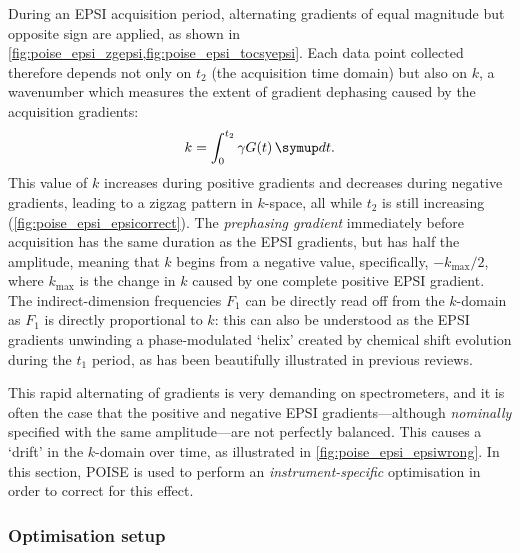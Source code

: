 During an EPSI acquisition period, alternating gradients of equal magnitude but opposite sign are applied, as shown in \cref{fig:poise_epsi_zgepsi,fig:poise_epsi_tocsyepsi}. Each data point collected therefore depends not only on $t_2$ (the acquisition time domain) but also on $k$, a wavenumber which measures the extent of gradient dephasing caused by the acquisition gradients:
\begin{equation}
    \label{eq:epsi_k_space}
    k = \int_0^{t_2} \gamma G(t) \,\md t.
\end{equation}
This value of $k$ increases during positive gradients and decreases during negative gradients, leading to a zigzag pattern in $k$-space, all while $t_2$ is still increasing (\cref{fig:poise_epsi_epsicorrect}).
The \textit{prephasing gradient} immediately before acquisition has the same duration as the EPSI gradients, but has half the amplitude, meaning that $k$ begins from a negative value, specifically, $-k_\text{max} / 2$, where $k_\text{max}$ is the change in $k$ caused by one complete positive EPSI gradient.
The indirect-dimension frequencies $F_1$ can be directly read off from the $k$-domain as $F_1$ is directly proportional to $k$: this can also be understood as the EPSI gradients unwinding a phase-modulated `helix' created by chemical shift evolution during the $t_1$ period, as has been beautifully illustrated in previous reviews.\autocite{Frydman2003JACS,Tal2010PNMRS}

This rapid alternating of gradients is very demanding on spectrometers, and it is often the case that the positive and negative EPSI gradients---although \textit{nominally} specified with the same amplitude---are not perfectly balanced.
This causes a `drift' in the $k$-domain over time, as illustrated in \cref{fig:poise_epsi_epsiwrong}.
In this section, POISE is used to perform an \textit{instrument-specific} optimisation in order to correct for this effect.


\subsubsection{Optimisation setup}

